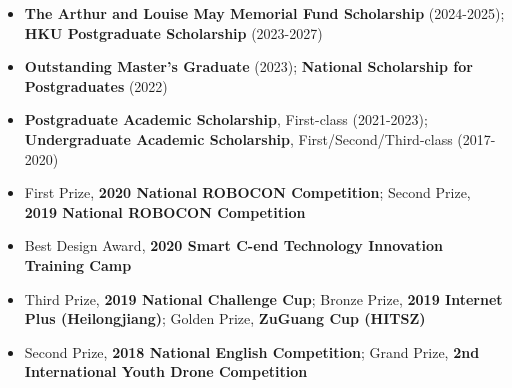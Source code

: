 %
%



\footnotesize

\begin{itemize}
	\item{\textbf{The Arthur and Louise May Memorial Fund Scholarship} (2024-2025)}; {\textbf{HKU Postgraduate Scholarship} (2023-2027)}
    \item{\textbf{Outstanding Master's Graduate} (2023); \textbf{National Scholarship for Postgraduates} (2022)}

    \item{\textbf{Postgraduate Academic Scholarship}, First-class (2021-2023); \textbf{Undergraduate Academic Scholarship}, First/Second/Third-class (2017-2020)}
    
    \item{First Prize, \textbf{2020 National ROBOCON Competition}; Second Prize, \textbf{2019 National ROBOCON Competition}}
    \item {Best Design Award, \textbf{2020 Smart C-end Technology Innovation Training Camp}}
    
    \item{Third Prize, \textbf{2019 National Challenge Cup}; Bronze Prize, \textbf{2019 Internet Plus (Heilongjiang)}; Golden Prize, \textbf{ZuGuang Cup (HITSZ)}}
    
    \item{Second Prize, \textbf{2018 National English Competition}; Grand Prize, \textbf{2nd International Youth Drone Competition}}
\end{itemize}



